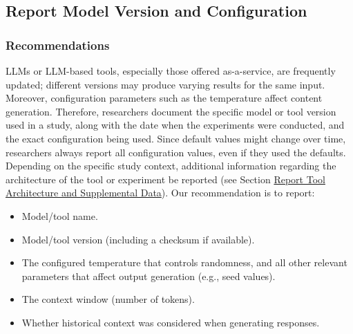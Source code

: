 



\subsection{Report Model Version and Configuration}

\subsubsection{Recommendations}




LLMs or LLM-based tools, especially those offered as-a-service, are frequently updated; different versions may produce varying results for the same input.
Moreover, configuration parameters such as the temperature affect content generation.
Therefore, researchers \must document the specific model or tool version used in a study, along with the date when the experiments were conducted, and the exact configuration being used.
Since default values might change over time, researchers \should always report all configuration values, even if they used the defaults.
Depending on the specific study context, additional information regarding the architecture of the tool or experiment \should be reported (see Section \href{/guidelines/#report-tool-architecture-and-supplemental-data}{Report Tool Architecture and Supplemental Data}).
Our recommendation is to report:

\begin{itemize}
\item Model/tool name.
\item Model/tool version (including a checksum if available).
\item The configured temperature that controls randomness, and all other relevant parameters that affect output generation (e.g., seed values).
\item The context window (number of tokens).
\item Whether historical context was considered when generating responses.
\end{itemize}

